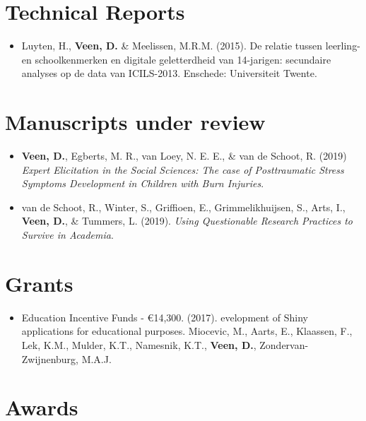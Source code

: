 \documentclass[openright,titlepage,12pt,a4paper]{book}
\providecommand{\tightlist}{%
  \setlength{\itemsep}{0pt}\setlength{\parskip}{0pt}}
\begin{document}
\hypertarget{technical-reports}{%
\section*{Technical Reports}\label{technical-reports}}

\begin{itemize}
\tightlist
\item
  Luyten, H., \textbf{Veen, D.} \& Meelissen, M.R.M. (2015). De relatie tussen leerling- en schoolkenmerken en digitale geletterdheid van 14-jarigen: secundaire analyses op de data van ICILS-2013. Enschede: Universiteit Twente.
\end{itemize}

\hypertarget{manuscripts-under-review}{%
\section*{Manuscripts under review}\label{manuscripts-under-review}}

\begin{itemize}
\item
  \textbf{Veen, D.}, Egberts, M. R., van Loey, N. E. E., \& van de Schoot, R. (2019) \emph{Expert Elicitation in the Social Sciences: The case of Posttraumatic Stress Symptoms Development in Children with Burn Injuries}.
\item
  van de Schoot, R., Winter, S., Griffioen, E., Grimmelikhuijsen, S., Arts, I., \textbf{Veen, D.}, \& Tummers, L. (2019). \emph{Using Questionable Research Practices to Survive in Academia}.
\end{itemize}

\hypertarget{grants}{%
\section*{Grants}\label{grants}}

\begin{itemize}
\tightlist
\item
  Education Incentive Funds - €14,300. (2017). evelopment of Shiny applications for educational purposes. Miocevic, M., Aarts, E., Klaassen, F., Lek, K.M., Mulder, K.T., Namesnik, K.T., \textbf{Veen, D.}, Zondervan-Zwijnenburg, M.A.J.
\end{itemize}

\hypertarget{awards}{%
\section*{Awards}\label{awards}}
\end{document}

